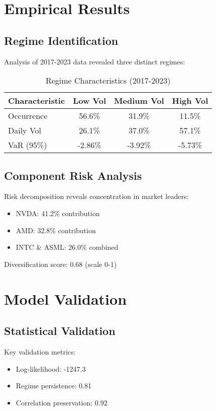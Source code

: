 \section{Empirical Results}

\subsection{Regime Identification}
Analysis of 2017-2023 data revealed three distinct regimes:

\begin{table}[h]
\centering
\begin{tabular}{lccc}
\hline
Characteristic & Low Vol & Medium Vol & High Vol \\
\hline
Occurrence & 56.6\% & 31.9\% & 11.5\% \\
Daily Vol & 26.1\% & 37.0\% & 57.1\% \\
VaR (95\%) & -2.86\% & -3.92\% & -5.73\% \\
\hline
\end{tabular}
\caption{Regime Characteristics (2017-2023)}
\label{tab:regime_chars}
\end{table}

\subsection{Component Risk Analysis}
Risk decomposition reveals concentration in market leaders:

\begin{itemize}
    \item NVDA: 41.2\% contribution
    \item AMD: 32.8\% contribution
    \item INTC \& ASML: 26.0\% combined
\end{itemize}

Diversification score: 0.68 (scale 0-1)

\section{Model Validation}

\subsection{Statistical Validation}
Key validation metrics:
\begin{itemize}
    \item Log-likelihood: -1247.3
    \item Regime persistence: 0.81
    \item Correlation preservation: 0.92
\end{itemize}

